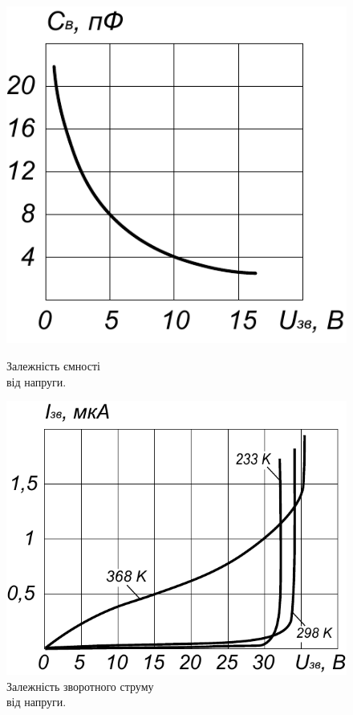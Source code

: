 \documentclass[a4paper,14pt]{extreport}
\begin{document}
\begin{figure}[h!]\label{im7}
  \begin{minipage}[h]{0.5\linewidth}
    \includegraphics[width=1\linewidth]{1.4.4.pdf}
    \caption{Залежність ємності\\ від напруги.}
  \end{minipage}
\hfill
  \begin{minipage}[h]{0.55\linewidth}
    \includegraphics[width=1\linewidth]{1.4.5.pdf}
    \caption{Залежність зворотного струму\\ від напруги.}
  \end{minipage}
\end{figure}
\end{document}
